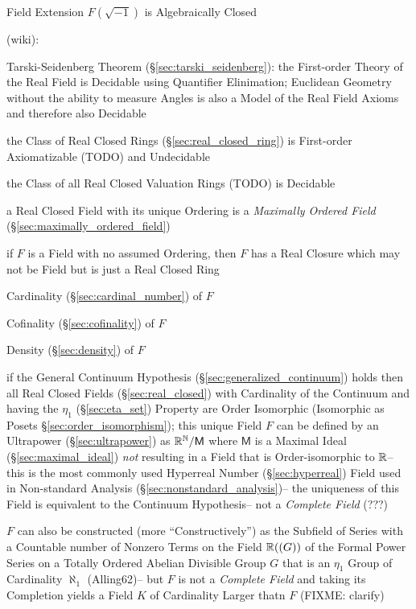 \begin{itemize}
Field Extension $F(\sqrt{-1})$ is Algebraically Closed

(wiki):

Tarski-Seidenberg Theorem (\S\ref{sec:tarski_seidenberg}): the First-order
Theory of the Real Field is Decidable using Quantifier Elinimation; Euclidean
Geometry without the ability to measure Angles is also a Model of the Real
Field Axioms and therefore also Decidable

the Class of Real Closed Rings (\S\ref{sec:real_closed_ring}) is First-order
Axiomatizable (TODO) and Undecidable

the Class of all Real Closed Valuation Rings (TODO) is Decidable

a Real Closed Field with its unique Ordering is a \emph{Maximally Ordered
  Field} (\S\ref{sec:maximally_ordered_field})

if $F$ is a Field with no assumed Ordering, then $F$ has a Real Closure which
may not be Field but is just a Real Closed Ring

Cardinality (\S\ref{sec:cardinal_number}) of $F$

Cofinality (\S\ref{sec:cofinality}) of $F$

Density (\S\ref{sec:density}) of $F$

if the General Continuum Hypothesis (\S\ref{sec:generalized_continuum}) holds
then all Real Closed Fields (\S\ref{sec:real_closed}) with Cardinality of the
Continuum and having the $\eta_1$ (\S\ref{sec:eta_set}) Property are Order
Isomorphic (Isomorphic as Posets \S\ref{sec:order_isomorphism});
this unique Field $F$ can be defined by an Ultrapower (\S\ref{sec:ultrapower})
as $\mathbb{R}^{\mathbb{N}} / \mathsf{M}$ where $\mathsf{M}$ is a Maximal Ideal
(\S\ref{sec:maximal_ideal}) \emph{not} resulting in a Field that is
Order-isomorphic to $\mathbb{R}$-- this is the most commonly used Hyperreal Number
(\S\ref{sec:hyperreal}) Field used in Non-standard Analysis
(\S\ref{sec:nonstandard_analysis})-- the uniqueness of this Field is equivalent
to the Continuum Hypothesis-- not a \emph{Complete Field} (???) %

$F$ can also be constructed (more ``Constructively'') as the Subfield of Series
with a Countable number of Nonzero Terms on the Field $\mathbb{R}((G))$ of the
Formal Power Series on a Totally Ordered Abelian Divisible Group $G$ that is an
$\eta_1$ Group of Cardinality $\aleph_1$ (Alling62)-- but $F$ is not a
\emph{Complete Field} and taking its Completion yields a Field $K$ of
Cardinality Larger thatn $F$ (FIXME: clarify)


\end{itemize}
